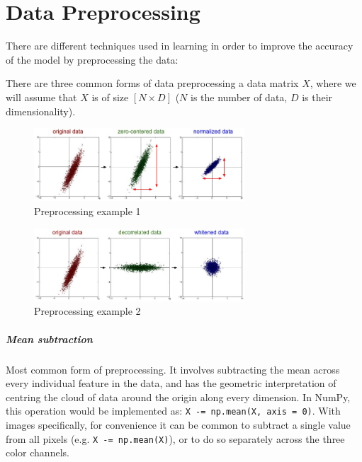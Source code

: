 \chapter{Data Preprocessing}

There are different techniques used in learning in order to improve the accuracy of the model by preprocessing the data:

There are three common forms of data preprocessing a data matrix $X$, where we will assume that $X$ is of size $[N \times D]$ ($N$ is the number of data, $D$ is their dimensionality).

\begin{figure}[!htb]
  \centering
  \includegraphics[width=0.7\textwidth]{Images/data_preprocessing/1.png}
  \caption{Preprocessing example 1}
\end{figure}

\begin{figure}[!htb]
  \centering
  \includegraphics[width=0.7\textwidth]{Images/data_preprocessing/2.png}
  \caption{Preprocessing example 2}
\end{figure}

\paragraph*{Mean subtraction} Most common form of preprocessing. It involves subtracting the mean across every individual feature in the data, and has the geometric interpretation of centring the cloud of data around the origin along every dimension. In NumPy, this operation would be implemented as: \texttt{X -= np.mean(X, axis = 0)}. With images specifically, for convenience it can be common to subtract a single value from all pixels (e.g. \texttt{X -= np.mean(X)}), or to do so separately across the three color channels.

